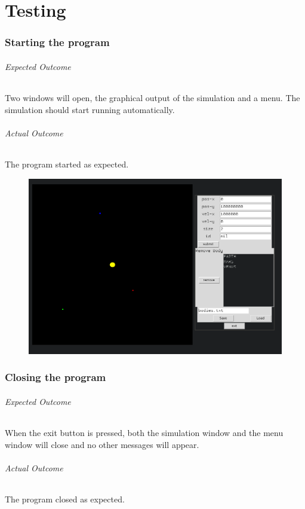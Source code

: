\part{Testing}
\section{Starting the program}
\paragraph{Expected Outcome} 
Two windows will open, the graphical output of the simulation and a menu. The
simulation should start running automatically. 
\paragraph{Actual Outcome} 
The program started as expected.
\begin{figure}[H]
	\includegraphics[width=\textwidth]{./img/start.png}
\end{figure}

\section{Closing the program}
\paragraph{Expected Outcome}
When the exit button is pressed, both the simulation window and the menu window
will close and no other messages will appear.
\paragraph{Actual Outcome}
The program closed as expected.


